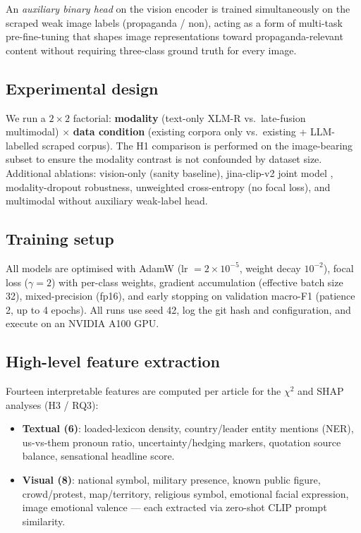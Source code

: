 \documentclass[12pt,a4paper]{article}
\begin{document}
An \emph{auxiliary binary head} on the vision encoder is trained simultaneously
on the scraped weak image labels (propaganda / non), acting as a form of
multi-task pre-fine-tuning that shapes image representations toward
propaganda-relevant content without requiring three-class ground truth for every
image.

\subsection{Experimental design}

We run a $2{\times}2$ factorial:
\textbf{modality} (text-only XLM-R vs.\ late-fusion multimodal)
$\times$
\textbf{data condition} (existing corpora only vs.\ existing + LLM-labelled scraped corpus).
The H1 comparison is performed on the image-bearing subset to ensure the
modality contrast is not confounded by dataset size.
Additional ablations: vision-only (sanity baseline),
jina-clip-v2 joint model \parencite{jinaclip2024},
modality-dropout robustness,
unweighted cross-entropy (no focal loss), and
multimodal without auxiliary weak-label head.

\subsection{Training setup}

All models are optimised with AdamW (lr $= 2{\times}10^{-5}$,
weight decay $10^{-2}$), focal loss ($\gamma{=}2$)
\parencite{lin2017focal} with per-class weights, gradient accumulation
(effective batch size 32), mixed-precision (fp16), and early stopping on
validation macro-F1 (patience 2, up to 4 epochs).
All runs use seed 42, log the git hash and configuration, and execute on an
NVIDIA A100 GPU.

\subsection{High-level feature extraction}

Fourteen interpretable features are computed per article for the $\chi^2$
and SHAP analyses (H3 / RQ3):

\begin{itemize}
  \item \textbf{Textual (6)}: loaded-lexicon density, country/leader entity
        mentions (NER), us-vs-them pronoun ratio, uncertainty/hedging markers,
        quotation source balance, sensational headline score.
  \item \textbf{Visual (8)}: national symbol, military presence, known public
        figure, crowd/protest, map/territory, religious symbol, emotional
        facial expression, image emotional valence --- each extracted via
        zero-shot CLIP prompt similarity.
\end{itemize}
\end{document}
